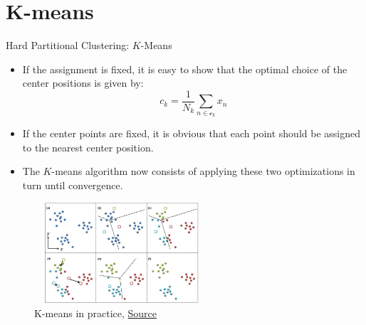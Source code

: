 \documentclass[compress,oilve]{beamer}
\begin{document}
\section{K-means}
\begin{frame}{Hard Partitional Clustering: $K$-Means}
	\begin{itemize}
		\item If the assignment is fixed, it is easy to show that the optimal choice of the center positions is given
		by:
		\begin{equation*}
			c_k = \frac{1}{N_k}\sum_{n\in\mathcal{c}_k}x_n
		\end{equation*}
	
		\item If the center points are fixed, it is obvious that each point should be assigned to the nearest center position.
	
		\medskip
		\item The $K$-means algorithm now consists of applying these two optimizations in turn until convergence.

	\end{itemize}

	\begin{figure}
		\includegraphics[width=6.5cm, height=3.75cm]{Figs/4.png}
		\caption{K-means in practice, \href{	https://tinyurl.com/2q6ec2c6}{Source}}
	\end{figure}

\end{frame}
\end{document}

